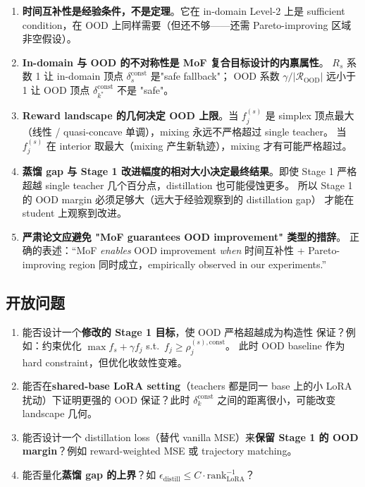 \documentclass[11pt,a4paper]{article}
\newcommand{\OOD}{\mathrm{OOD}}
\newcommand{\const}{\mathrm{const}}
\theoremstyle{definition}
\begin{document}
\begin{enumerate}[leftmargin=1.5em]
\item \textbf{时间互补性是经验条件，不是定理}。它在 in-domain Level-2 上是
sufficient condition，在 OOD 上同样需要（但还不够——还需 Pareto-improving
区域非空假设）。

\item \textbf{In-domain 与 OOD 的不对称性是 MoF 复合目标设计的内禀属性}。
$R_s$ 系数 1 让 in-domain 顶点 $\delta_s^\const$ 是"safe fallback"；
OOD 系数 $\gamma/|\mathcal{R}_{\OOD}|$ 远小于 1 让 OOD 顶点
$\delta_{k^*}^\const$ 不是 "safe"。

\item \textbf{Reward landscape 的几何决定 OOD 上限}。当 $f_j^{(s)}$ 是 simplex
顶点最大（线性 / quasi-concave 单调），mixing 永远不严格超过 single teacher。
当 $f_j^{(s)}$ 在 interior 取最大（mixing 产生新轨迹），mixing 才有可能严格超过。

\item \textbf{蒸馏 gap 与 Stage 1 改进幅度的相对大小决定最终结果}。即使
Stage 1 严格超越 single teacher 几个百分点，distillation 也可能侵蚀更多。
所以 Stage 1 的 OOD margin 必须足够大（远大于经验观察到的 distillation gap）
才能在 student 上观察到改进。

\item \textbf{严肃论文应避免 "MoF guarantees OOD improvement" 类型的措辞}。
正确的表述：``MoF \emph{enables} OOD improvement \emph{when} 时间互补性 +
Pareto-improving region 同时成立，empirically observed in our experiments.''
\end{enumerate}

\subsection{开放问题}

\begin{enumerate}[leftmargin=1.5em]
\item 能否设计一个\textbf{修改的 Stage 1 目标}，使 OOD 严格超越成为构造性
保证？例如：约束优化 $\max f_s + \gamma f_j$ s.t.~$f_j \geq \rho_j^{(s),\const}$。
此时 OOD baseline 作为 hard constraint，但优化收敛性变难。

\item 能否在\textbf{shared-base LoRA setting}（teachers 都是同一 base 上的小 LoRA
扰动）下证明更强的 OOD 保证？此时 $\delta_k^\const$ 之间的距离很小，可能改变
landscape 几何。

\item 能否设计一个 distillation loss（替代 vanilla MSE）来\textbf{保留 Stage 1
的 OOD margin}？例如 reward-weighted MSE 或 trajectory matching。

\item 能否量化\textbf{蒸馏 gap 的上界}？如 $\epsilon_{\text{distill}} \leq C \cdot \text{rank}_{\text{LoRA}}^{-1}$？
\end{enumerate}
\end{document}
